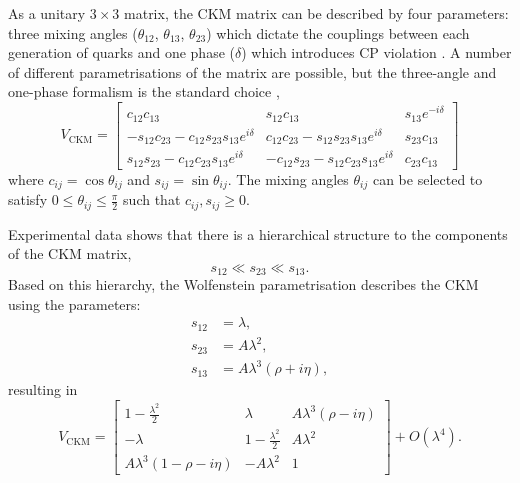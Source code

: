 \documentclass[../main.tex]{subfiles}
\begin{document}
    As a unitary $3\times3$ matrix, the \gls{CKM} matrix can be described by four parameters: three mixing angles ($\theta_{12}$, $\theta_{13}$, $\theta_{23}$) which dictate the couplings between each generation of quarks and one phase ($\delta$) which introduces \gls{CP} violation \cite{10.1143/PTP.49.652}. 
    A number of different parametrisations of the matrix are possible, but the three-angle and one-phase formalism is the standard choice \cite{PhysRevLett.53.1802}, 
    \begin{equation}\label{eq:angles}
    V_{\text{CKM}} =
    \begin{bmatrix}
    c_{12} c_{13} & s_{12} c_{13} & s_{13} e^{-i\delta} \\
    - s_{12} c_{23} - c_{12} s_{23} s_{13} e^{i\delta} & c_{12} c_{23} - s_{12} s_{23} s_{13} e^{i\delta} & s_{23} c_{13} \\
    s_{12} s_{23} - c_{12} c_{23} s_{13} e^{i\delta} & - c_{12} s_{23} - s_{12} c_{23} s_{13} e^{i\delta} & c_{23} c_{13}
    \end{bmatrix}
    \end{equation}  
    where $c_{ij} = \cos{\theta_{ij}}$ and $s_{ij} = \sin{\theta_{ij}}$. The mixing angles $\theta_{ij}$ can be selected to satisfy $0 \leq \theta_{ij} \leq \frac{\pi}{2}$ such that $c_{ij}, s_{ij} \geq 0$.

    Experimental data shows that there is a hierarchical structure to the components of the \gls{CKM} matrix, 
    \begin{equation}
        s_{12} \ll s_{23} \ll s_{13}.
    \end{equation}
    Based on this hierarchy, the Wolfenstein parametrisation \cite{PhysRevLett.51.1945} describes the \gls{CKM} using the parameters:
    \begin{equation}
        \begin{split}
            s_{12} &= \lambda, \\
            s_{23} &= A\lambda^2,\\
            s_{13} &= A\lambda^3(\rho + i\eta),
        \end{split}
    \end{equation}
    resulting in
    \begin{equation}\label{eq:wolf}
        V_{\text{CKM}} =
        \begin{bmatrix}
        1 - \frac{\lambda^2}{2} & \lambda & A\lambda^3 (\rho - i\eta) \\
        -\lambda & 1 - \frac{\lambda^2}{2} & A\lambda^2 \\
        A\lambda^3 (1 - \rho - i\eta) & -A\lambda^2 & 1
        \end{bmatrix}
        + O(\lambda^4).
    \end{equation}
    
\end{document}
